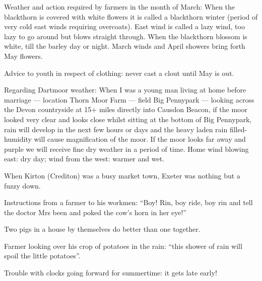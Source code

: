

Weather and action required by farmers in the month of March: When the
blackthorn is covered with white flowers it is called a blackthorn winter
(period of very cold east winds requiring overcoats).  East wind is called a
lazy wind, too lazy to go around but blows straight through. When the
blackthorn blossom is white, till the barley day or night. March winds and
April showers bring forth May flowers.

\bigskip
\noindent
Advice to youth in respect of clothing: never cast a clout until May is
out.

\bigskip
\noindent
Regarding Dartmoor weather:
When I was a young man living at home before marriage --- location Thorn
Moor Farm --- field Big Pennypark --- looking across the Devon countryside at
15+ miles directly into Causdon Beacon, if the moor looked very clear and
looks close whilst sitting at the bottom of Big Pennypark, rain will
develop in the next few hours or days and the heavy laden rain
filled-humidity will cause magnification of the moor. If the moor looks
far away and purple we will receive fine dry weather in a period of time.
Home wind blowing east: dry day; wind from the west: warmer and wet.

\bigskip
\noindent
When Kirton (Crediton) was a busy market town, Exeter was nothing but a
fuzzy down.

\bigskip
\noindent
Instructions from a farmer to his workmen: ``Boy! Rin, boy ride, boy rin
and tell the doctor Mrs been and poked the cow's horn in her eye!''

\bigskip
\noindent
Two pigs in a house by themselves do better than one together.

\bigskip
\noindent
Farmer looking over his crop of potatoes in the rain: ``this shower of
rain will spoil the little potatoes''.

\bigskip
\noindent
Trouble with clocks going forward for summertime: it gets late early!

\bigskip
\noindent